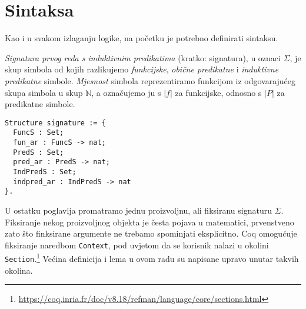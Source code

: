\section{Sintaksa}\label{sec:sintaksa}
Kao i u svakom izlaganju logike, na početku je potrebno definirati sintaksu.
\begin{definition}\label{def:signatura}
  \textit{Signatura prvog reda s induktivnim predikatima} (kratko: signatura), u oznaci \(\Sigma\),
  je skup simbola od kojih razlikujemo \textit{funkcijske}, \textit{obične predikatne}
  i \textit{induktivne predikatne} simbole.
  \textit{Mjesnost} simbola reprezentiramo funkcijom iz odgovarajućeg skupa simbola u skup \(\mathbb{N}\),
  a označujemo ju s \(|f|\) za funkcijske, odnosno s \(|P|\) za predikatne simbole.
  \begin{verbatim}
Structure signature := {
  FuncS : Set;
  fun_ar : FuncS -> nat;
  PredS : Set;
  pred_ar : PredS -> nat;
  IndPredS : Set;
  indpred_ar : IndPredS -> nat
}.
\end{verbatim}
\end{definition}
\noindent U ostatku poglavlja promatramo jednu proizvoljnu, ali fiksiranu signaturu \(\Sigma\).
Fiksiranje nekog proizvoljnog objekta je česta pojava u matematici,
prvenstveno zato što finksirane argumente ne trebamo spominjati eksplicitno.
Coq omogućuje fiksiranje naredbom \texttt{Context},
pod uvjetom da se korisnik nalazi u okolini \texttt{Section}.\footnote{\url{https://coq.inria.fr/doc/v8.18/refman/language/core/sections.html}}
Većina definicija i lema u ovom radu su napisane upravo unutar takvih okolina.

\begin{example}
\end{example}


